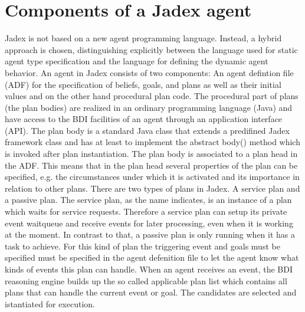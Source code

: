 \documentclass{llncs}
\begin{document}
\section{Components of a Jadex agent}
Jadex is not based on a new agent programming language. Instead, a hybrid approach is chosen, distinguishing explicitly between the language used for static agent type specification and the language for defining the dynamic agent behavior. An agent in Jadex consists of two components: An agent defintion file (ADF) for the specification of beliefs, goals, and plans as well as their initial values and on the other hand procedural plan code. The procedural part of plans  (the plan bodies) are realized in an ordinary programming language (Java) and have access to the BDI facilities of an agent through an application interface (API). The plan body is a standard Java class that extends a predifined Jadex framework class and has at least to implement the abstract body() method which is invoked after plan instantiation. The plan body is associated to a plan head in the ADF. This means that in the plan head several properties of the plan can be specified, e.g. the circumstances under which it is activated and its importance in relation to other plans. There are two types of plans in Jadex. A service plan and a passive plan. The service plan, as the name indicates, is an instance of a plan which waits for service requests. Therefore a service plan  can setup its private event waitqueue and receive events for later processing, even when it is working at the moment. In contrast to that, a passive plan is only running when it has a task to achieve. For this kind of plan the triggering event and goals must be specified must be specified in the agent defenition file to let the agent know what kinds of events this plan can handle. When an agent receives an event, the BDI reasoning engine builds up the so called applicable plan list which contains all plans that can handle the current event or goal. The candidates are selected and istantiated for execution.
\end{document}
